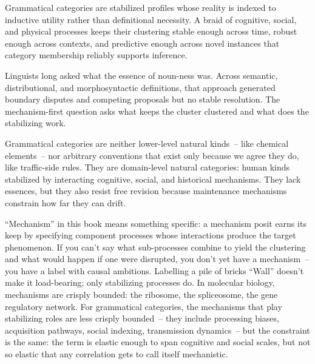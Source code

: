 Grammatical categories are stabilized profiles whose reality is indexed to inductive utility rather than definitional necessity. A braid of cognitive, social, and physical processes keeps their clustering stable enough across time, robust enough across contexts, and predictive enough across novel instances that category membership reliably supports inference.

Linguists long asked what the essence of noun-ness was. Across semantic, distributional, and morphosyntactic definitions, that approach generated boundary disputes and competing proposals but no stable resolution. The mechanism-first question asks what keeps the cluster clustered and what does the stabilizing work.

Grammatical categories are neither lower-level natural kinds~-- like chemical elements~-- nor arbitrary conventions that exist only because we agree they do, like traffic-side rules. They are domain-level natural categories: human kinds stabilized by interacting cognitive, social, and historical mechanisms. They lack essences, but they also resist free revision because maintenance mechanisms constrain how far they can drift.

\enquote{Mechanism} in this book means something specific: a mechanism posit earns its keep by specifying component processes whose interactions produce the target phenomenon. If you can't say what sub-processes combine to yield the clustering and what would happen if one were disrupted, you don't yet have a mechanism~-- you have a label with causal ambitions. Labelling a pile of bricks \enquote{Wall} doesn't make it load-bearing; only stabilizing processes do. In molecular biology, mechanisms are crisply bounded: the ribosome, the spliceosome, the gene regulatory network. For grammatical categories, the mechanisms that play stabilizing roles are less crisply bounded~-- they include processing biases, acquisition pathways, social indexing, transmission dynamics~-- but the constraint is the same: the term is elastic enough to span cognitive and social scales, but not so elastic that any correlation gets to call itself mechanistic.


